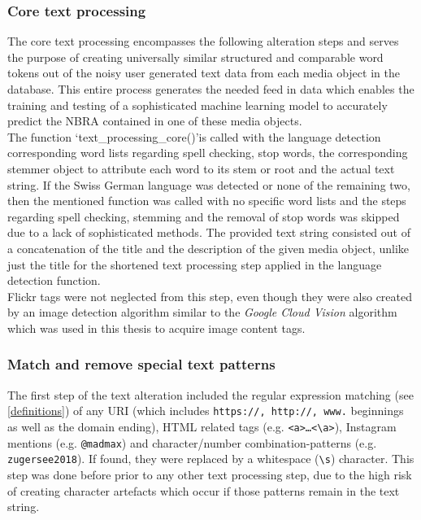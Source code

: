 \subsubsection{Core text processing} \label{core_text_processing}
The core text processing encompasses the following alteration steps and serves the purpose of creating universally similar structured and comparable word tokens out of the noisy user generated text data from each media object in the database. This entire process generates the needed feed in data which enables the training and testing of a sophisticated machine learning model to accurately predict the NBRA contained in one of these media objects.\\
\newline
The function \lq text\_processing\_core()\rq is called with the language detection corresponding word lists regarding spell checking, stop words, the corresponding stemmer object to attribute each word to its stem or root and the actual text string. If the Swiss German language was detected or none of the remaining two, then the mentioned function was called with no specific word lists and the steps regarding spell checking, stemming and the removal of stop words was skipped due to a lack of sophisticated methods. The provided text string consisted out of a concatenation of the title and the description of the given media object, unlike just the title for the shortened text processing step applied in the language detection function.\\
Flickr tags were not neglected from this step, even though they were also created by an image detection algorithm similar to the \textit{Google Cloud Vision} algorithm which was used in this thesis to acquire image content tags.

\subsubsection{Match and remove special text patterns} \label{text_patterns}
The first step of the text alteration included the regular expression matching (see \ref{definitions}) of any URI (which includes \texttt{https://, http://, www.} beginnings as well as the domain ending), HTML related tags (e.g. \texttt{<a>…<\backslash a>}), Instagram mentions (e.g. \texttt{@madmax}) and character/number combination-patterns (e.g. \texttt{zugersee2018}). If found, they were replaced by a whitespace (\texttt{\backslash s}) character. This step was done before prior to any other text processing step, due to the high risk of creating character artefacts which occur if those patterns remain in the text string.

